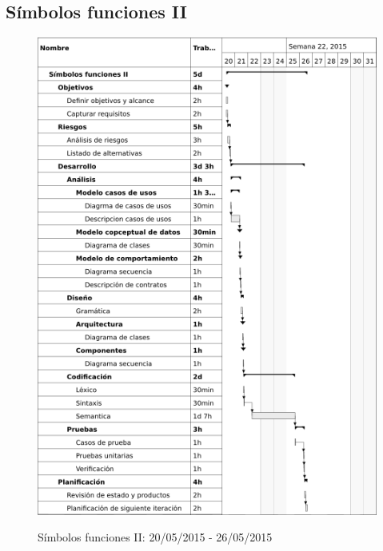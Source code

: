 \subsection{Símbolos funciones II}
\begin{center}
\begin{figure}[H]
\centering
\includegraphics[scale=1]{planning/29-simbolos-funciones-ii.png} \\
\caption{Símbolos funciones II: 20/05/2015 - 26/05/2015 }
\end{figure}
\end{center}

